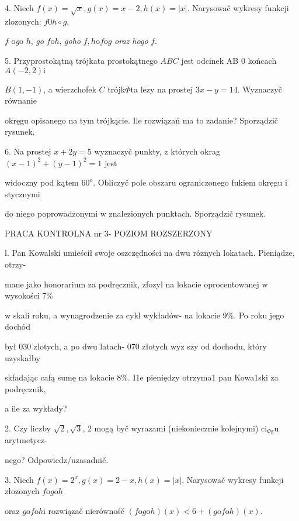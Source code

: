 \documentclass[a4paper,12pt]{article}
\begin{document}
4. Niech $f(x)=\sqrt{x}, g(x)=x-2, h(x)=|x|$. Narysowač wykresy funkcji zlozonych: $f0h\circ g,$

$f$ o{\it g}o $h$, {\it go} $f\mathrm{o}h$, {\it goho} $f, h\mathrm{o}f\mathrm{o}g$ {\it oraz hogo} $f.$

5. Przyprostokątną trójkata prostokątnego $ABC$ jest odcinek AB $0$ końcach $A(-2,2) \mathrm{i}$

$B(1,-1)$, a wierzchofek $C$ trójk$\Phi$ta $\mathrm{l}\mathrm{e}\dot{\mathrm{z}}\mathrm{y}$ na prostej $3x-y= 14$. Wyznaczyč równanie

okręgu opisanego na tym trójkącie. Ile rozwiązań ma to zadanie? Sporządzič rysunek.

6. Na prostej $x+2y=5$ wyznaczyč punkty, $\mathrm{z}$ których okrag $(x-1)^{2}+(y-1)^{2}=1$ jest

widoczny pod kątem $60^{\mathrm{o}}$. Obliczyč pole obszaru ograniczonego fukiem okręgu $\mathrm{i}$ stycznymi

do niego poprowadzonymi $\mathrm{w}$ znalezionych punktach. Sporządzič rysunek.





PRACA KONTROLNA nr 3- POZIOM ROZSZERZONY

l. Pan Kowalski umieścił swoje oszczędności na dwu róznych lokatach. Pieniądze, otrzy-

mane jako honorarium za podręcznik, zfozyl na lokacie oprocentowanej $\mathrm{w}$ wysokości 7\%

$\mathrm{w}$ skali roku, a wynagrodzenie za cykl wykładów- na lokacie 9\%. Po roku jego dochód

był $030$ zlotych, a po dwu latach- $070$ złotych $\mathrm{w}\mathrm{y}\dot{\mathrm{z}}$ szy od dochodu, który uzyskałby

skfadając cafą sumę na lokacie 8\%. I1e pieniędzy otrzyma1 pan Kowa1ski za podręcznik,

a ile za wykłady?

2. Czy liczby $\sqrt{2}, \sqrt{3}$, 2 mogą byč wyrazami (niekoniecznie kolejnymi) $\mathrm{c}\mathrm{i}_{\Phi \mathrm{g}}\mathrm{u}$ arytmetycz-

nego? Odpowiedz/uzasadnič.

3. Niech $f(x)=2^{x}, g(x)=2-x, h(x)=|x|$. Narysowač wykresy funkcji złozonych $f\mathrm{o}g\mathrm{o}h$

oraz $g\mathrm{o}f\mathrm{o}h\mathrm{i}$ rozwiązač nierównośč $(f\mathrm{o}g\mathrm{o}h)(x)<6+(g\mathrm{o}f\mathrm{o}h)(x).$
\end{document}
